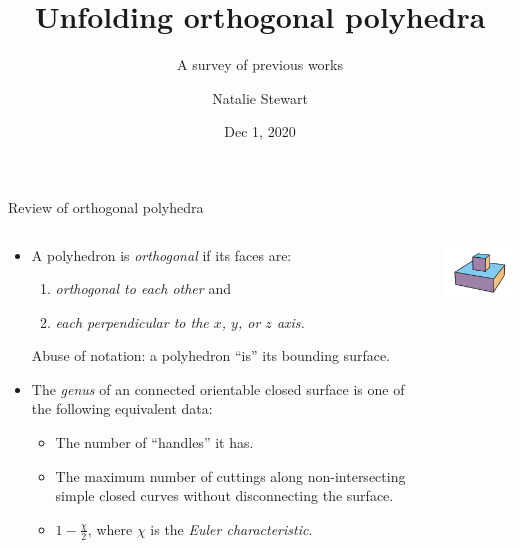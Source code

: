 \documentclass{beamer}
\theoremstyle{plain}
\begin{document}
  \title{Unfolding orthogonal polyhedra}
  \subtitle{A survey of previous works}
  \author{Natalie Stewart}
  \date{Dec 1, 2020}
  \frame{\titlepage}



  \begin{frame}{Review of orthogonal polyhedra}
    \begin{columns}
      \begin{column}{0.8\textwidth}
        \begin{itemize}
          \item A polyhedron is \emph{orthogonal} if its faces are:
            \begin{enumerate}
              \pause \item \emph{orthogonal to each other} and 
              \pause \item \emph{each perpendicular to the $x$, $y$, or $z$ axis.}
            \end{enumerate}
            \pause Abuse of notation: a polyhedron ``is'' its bounding surface.
          \pause \item The \emph{genus} of an connected orientable closed surface is one of the following equivalent data:
            \begin{itemize}
              \item The number of ``handles'' it has.
              \item The maximum number of cuttings along non-intersecting simple closed curves without disconnecting the surface.
              \item $1 - \frac{\chi}{2}$, where $\chi$ is the \emph{Euler characteristic}.
            \end{itemize}
        \end{itemize}  
      \end{column}
      \begin{column}{.2\textwidth}
        \begin{center}
          \includegraphics[width=.8\textwidth]{./figs/genus_0_orthogonal_polyhedron.png}\\

\end{center}
\end{column}
\end{columns}
\end{frame}
\end{document}
